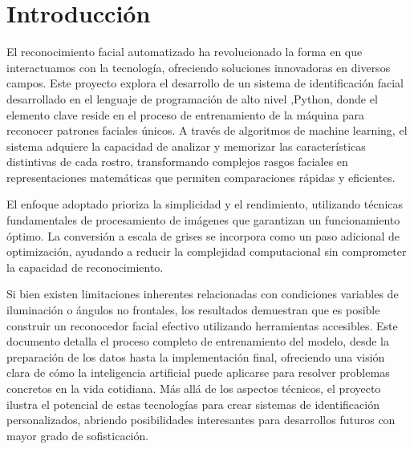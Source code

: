 \documentclass[12pt]{article}
\begin{document}
{\fontsize{12}{18}\selectfont %
\doublespacing
    
\sectionfont{\Large} 	%
\subsectionfont{\large} %
\subsubsectionfont{\normalsize}

\tableofcontents

\section{Introducción}
El reconocimiento facial automatizado ha revolucionado la forma en que interactuamos con la tecnología, ofreciendo soluciones innovadoras en diversos campos. Este proyecto explora el desarrollo de un sistema de identificación facial desarrollado en el lenguaje de programación de alto nivel ,Python, donde el elemento clave reside en el proceso de entrenamiento de la máquina para reconocer patrones faciales únicos. A través de algoritmos de machine learning, el sistema adquiere la capacidad de analizar y memorizar las características distintivas de cada rostro, transformando complejos rasgos faciales en representaciones matemáticas que permiten comparaciones rápidas y eficientes.

El enfoque adoptado prioriza la simplicidad y el rendimiento, utilizando técnicas fundamentales de procesamiento de imágenes que garantizan un funcionamiento óptimo. La conversión a escala de grises se incorpora como un paso adicional de optimización, ayudando a reducir la complejidad computacional sin comprometer la capacidad de reconocimiento.

Si bien existen limitaciones inherentes relacionadas con condiciones variables de iluminación o ángulos no frontales, los resultados demuestran que es posible construir un reconocedor facial efectivo utilizando herramientas accesibles. Este documento detalla el proceso completo de entrenamiento del modelo, desde la preparación de los datos hasta la implementación final, ofreciendo una visión clara de cómo la inteligencia artificial puede aplicarse para resolver problemas concretos en la vida cotidiana. Más allá de los aspectos técnicos, el proyecto ilustra el potencial de estas tecnologías para crear sistemas de identificación personalizados, abriendo posibilidades interesantes para desarrollos futuros con mayor grado de sofisticación.


}
\end{document}
